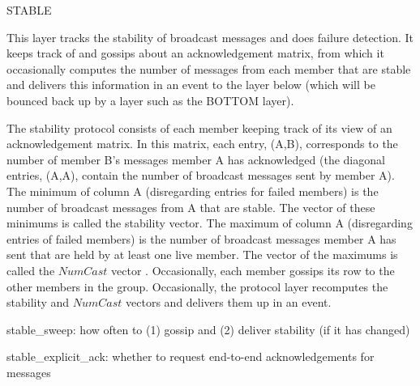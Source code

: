 \begin{Layer}{STABLE}

This layer tracks the stability of broadcast messages and does
failure detection.  It keeps track of and gossips about an
acknowledgement matrix, from which it occasionally computes the
number of messages from each member that are stable and delivers this
information in an  event to the layer below (which will be
bounced back up by a layer such as the BOTTOM layer).

\begin{Protocol}
The stability protocol consists of each member keeping track of its
view of an acknowledgement matrix.  In this matrix, each entry,
(A,B), corresponds to the number of member B's messages member A has
acknowledged (the diagonal entries, (A,A), contain the number of
broadcast messages sent by member A).  The minimum of column A
(disregarding entries for failed members) is the number of broadcast
messages from A that are stable.  The vector of these minimums is
called the stability vector.  The maximum of column A (disregarding
entries of failed members) is the number of broadcast messages member
A has sent that are held by at least one live member.  The vector of
the maximums is called the $NumCast$ vector .  Occasionally, each member gossips its row to the
other members in the group.  Occasionally, the protocol layer
recomputes the stability and $NumCast$ vectors and delivers them up
in an  event.
\end{Protocol}

\begin{Parameters}
\item 
stable\_sweep: how often to (1) gossip and (2) deliver stability (if
it has changed)
\item 
stable\_explicit\_ack: whether to request end-to-end acknowledgements
for messages
\end{Parameters}


\end{Layer}
